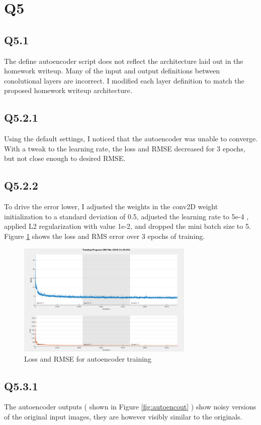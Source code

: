 \documentclass[12pt]{article}
\begin{document}
\section{Q5}
\subsection{Q5.1}
The define autoencoder script does not reflect the architecture laid out in the homework writeup. Many of the input and output definitions between conolutional layers are incorrect. I modified each layer definition to match the proposed homework writeup architecture.

\subsection{Q5.2.1}
Using the default settings, I noticed that the autoencoder was unable to converge. With a tweak to the learning rate, the loss and RMSE decreased for 3 epochs, but not close enough to desired RMSE. 

\subsection{Q5.2.2}
To drive the error lower, I adjusted the weights in the conv2D weight initialization to a standard deviation of 0.5, adjusted the learning rate to 5e-4 , applied L2 regularization with value 1e-2, and dropped the mini batch size to 5. Figure \ref{fig:nist36confusion} shows the loss and RMS error over 3 epochs of training.

\begin{figure}[H]
\centering
\includegraphics[page=1,width=0.75\textwidth]{q522_mrse4}
\caption{ Loss and RMSE for autoencoder training } 
\label{fig:nist36confusion}
\end{figure}   

\subsection{Q5.3.1}
The autoencoder outputs ( shown in Figure \ref{fig:autoencout} ) show noisy versions of the original input images, they are however visibly similar to the originals.
\end{document}
